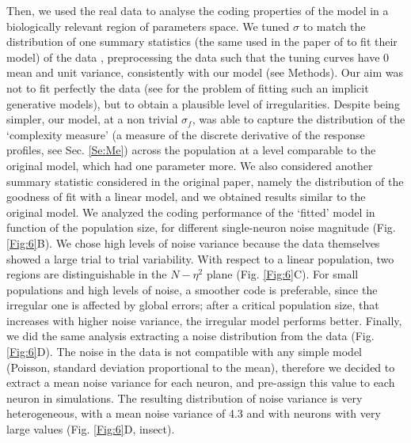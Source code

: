 \documentclass[a4paper]{article}
\begin{document}
Then, we used the real data to analyse the coding properties of the model in a biologically relevant region of parameters space. We tuned  $\sigma$  to match the distribution of one summary statistics (the same used in the paper of \cite{Lalazar2016TuningConnectivity} to fit their model) of the data , preprocessing the data such that the tuning curves have 0 mean and unit variance, consistently with our model (see Methods). Our aim was not to fit perfectly the data (see \cite{Arakaki2019InferringCurvesc} for the problem of fitting such an implicit generative models), but to obtain a plausible level of irregularities.
Despite being simpler, our model, at a non trivial  $\sigma_f$, was able to capture the distribution of the `complexity measure' (a measure of the discrete derivative of the response profiles, see Sec. \ref{Se:Me}) across the population at a level comparable to the original model, which had one parameter more. We also considered another summary statistic considered in the original paper, namely the distribution of the goodness of fit with a linear model, and we obtained results  similar to the original model.
We analyzed the coding performance of the `fitted' model in function of the population size, for different single-neuron noise magnitude (Fig. \ref{Fig:6}B). We chose high levels of noise variance because the data themselves showed a large trial to trial variability.
With respect to a linear population, two regions are distinguishable in the $N-\eta^2$ plane (Fig. \ref{Fig:6}C). For small populations and high levels of noise, a smoother code is preferable, since the irregular one is affected by global errors; after a critical population size, that increases with higher noise variance, the irregular model performs better.
Finally, we did the same analysis extracting a noise distribution from the data (Fig. \ref{Fig:6}D). The noise in the data is not compatible with any simple model (Poisson, standard deviation proportional to the mean), therefore we decided to extract a mean noise variance for each neuron, and pre-assign this value to each neuron in simulations. The resulting distribution of noise variance is very heterogeneous, with a mean noise variance of 4.3 and with neurons with very large values (Fig. \ref{Fig:6}D, insect).
\end{document}

